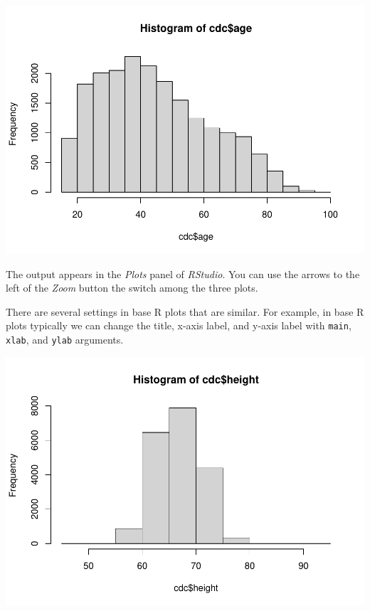 \documentclass[
]{book}
\newenvironment{Shaded}{\begin{snugshade}}{\end{snugshade}}
\newcommand{\DataTypeTok}[1]{\textcolor[rgb]{0.13,0.29,0.53}{#1}}
\newcommand{\KeywordTok}[1]{\textcolor[rgb]{0.13,0.29,0.53}{\textbf{#1}}}
\newcommand{\NormalTok}[1]{#1}
\newcommand{\OperatorTok}[1]{\textcolor[rgb]{0.81,0.36,0.00}{\textbf{#1}}}
\newcommand{\StringTok}[1]{\textcolor[rgb]{0.31,0.60,0.02}{#1}}
\begin{document}
\begin{Shaded}
\end{Shaded}

\includegraphics{_main_files/figure-latex/unnamed-chunk-169-3.pdf}

The output appears in the \emph{Plots} panel of \emph{RStudio}. You can use the arrows to the left of the \emph{Zoom} button the switch among the three plots.

There are several settings in base R plots that are similar. For example, in base R plots typically we can change the title, x-axis label, and y-axis label with \texttt{main}, \texttt{xlab}, and \texttt{ylab} arguments.

\begin{Shaded}
\end{Shaded}

\includegraphics{_main_files/figure-latex/unnamed-chunk-170-1.pdf}
\end{document}
